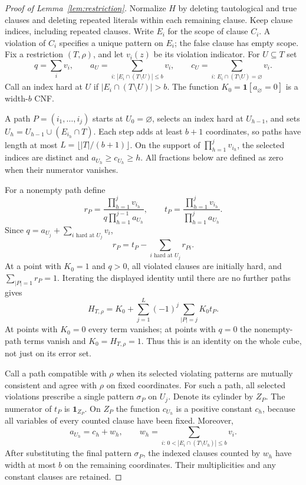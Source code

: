 \documentclass[11pt,letterpaper]{article}
\theoremstyle{definition}
\numberwithin{equation}{section}
\begin{document}
\begin{proof}[Proof of Lemma~\ref{lem:restriction}]
Normalize $H$ by deleting tautological and true clauses and deleting repeated
literals within each remaining clause. Keep clause indices, including
repeated clauses. Write $E_i$ for the scope of clause $C_i$. A violation of
$C_i$ specifies a unique pattern on $E_i$; the false clause has empty scope.
Fix a restriction $(T,\rho)$, and let $v_i(z)$ be its violation indicator.
For $U\subseteq T$ set
\[
 q=\sum_i v_i,\qquad
 a_U=\sum_{i:\,|E_i\cap(T\setminus U)|\le b}v_i,\qquad
 c_U=\sum_{i:\,E_i\cap(T\setminus U)=\varnothing}v_i.
\]
Call an index hard at $U$ if $|E_i\cap(T\setminus U)|>b$.
The function $K_0=\mathbf1[a_\varnothing=0]$ is a width-$b$ CNF.

A path $P=(i_1,\ldots,i_j)$ starts at $U_0=\varnothing$, selects an index
hard at $U_{h-1}$, and sets $U_h=U_{h-1}\cup(E_{i_h}\cap T)$.
Each step adds at least $b+1$ coordinates, so paths have length at most
$L=\lfloor |T|/(b+1)\rfloor$. On the support of
$\prod_{h=1}^j v_{i_h}$, the selected indices are distinct and
$a_{U_h}\ge c_{U_h}\ge h$.
All fractions below are defined as zero when their numerator vanishes.

For a nonempty path define
\[
 r_P=\frac{\prod_{h=1}^jv_{i_h}}
                {q\prod_{h=1}^{j-1}a_{U_h}},\qquad
 t_P=\frac{\prod_{h=1}^jv_{i_h}}
                {\prod_{h=1}^{j}a_{U_h}}.
\]
Since $q=a_{U_j}+\sum_{i\text{ hard at }U_j}v_i$,
\[
 r_P=t_P-\sum_{i\text{ hard at }U_j}r_{Pi}.
\]
At a point with $K_0=1$ and $q>0$, all violated clauses are initially hard,
and $\sum_{|P|=1}r_P=1$. Iterating the displayed identity until there are
no further paths gives
\begin{equation}\label{eq:audited-expansion}
 H_{T,\rho}=K_0+
   \sum_{j=1}^{L}(-1)^j\sum_{|P|=j}K_0t_P.
\end{equation}
At points with $K_0=0$ every term vanishes; at points with $q=0$ the
nonempty-path terms vanish and $K_0=H_{T,\rho}=1$.
Thus this is an identity on the whole cube, not just on its error set.

Call a path compatible with $\rho$ when its selected violating patterns
are mutually consistent and agree with $\rho$ on fixed coordinates.
For such a path, all selected violations prescribe a single pattern
$\sigma_P$ on $U_j$. Denote its cylinder by $Z_P$.
The numerator of $t_P$ is $\mathbf1_{Z_P}$.
On $Z_P$ the function $c_{U_h}$ is a positive constant $c_h$, because all
variables of every counted clause have been fixed. Moreover,
\[
 a_{U_h}=c_h+w_h,
 \qquad
 w_h=\sum_{i:\,0<|E_i\cap(T\setminus U_h)|\le b}v_i.
\]
After substituting the final pattern $\sigma_P$, the indexed clauses
counted by $w_h$ have width at most $b$ on the remaining coordinates.
Their multiplicities and any constant clauses are retained.


\end{proof}
\end{document}
